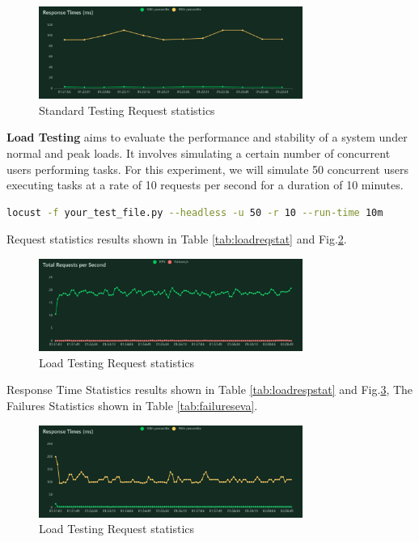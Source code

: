 \documentclass[journal]{IEEEtran}
\begin{document}
\begin{figure}[h]
  \centering
  \includegraphics[width=3.4in]{figures/stdrespstat.png}
  \caption{Standard Testing Request statistics}
  \label{fig:stdrespstat}
  \end{figure}

\textbf{Load Testing} aims to evaluate the performance and stability of a system under normal and peak loads. It involves simulating a certain number of concurrent users performing tasks. For this experiment, we will simulate 50 concurrent users executing tasks at a rate of 10 requests per second for a duration of 10 minutes. 
\begin{lstlisting}[label={lst:locustcmd},language=BASH,breaklines=true]
locust -f your_test_file.py --headless -u 50 -r 10 --run-time 10m 
\end{lstlisting}

Request statistics results shown in Table \ref{tab:loadreqstat} and Fig.\ref{fig:loadreqstat}.

\begin{figure}[h]
  \centering
  \includegraphics[width=3.4in]{figures/loadreqstat.png}
  \caption{Load Testing Request statistics}
  \label{fig:loadreqstat}
  \end{figure}



Response Time Statistics results shown in Table \ref{tab:loadrespstat} and Fig.\ref{fig:loadrespstat}, The Failures Statistics shown in Table \ref{tab:failureseva}.


\begin{figure}[h]
  \centering
  \includegraphics[width=3.4in]{figures/loadrespstat.png}
  \caption{Load Testing Request statistics}
  \label{fig:loadrespstat}
  \end{figure}
\end{document}
